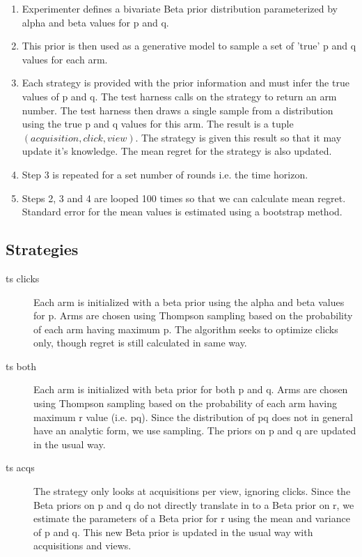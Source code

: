 \documentclass[11pt,a4,singlespacing,titlepagenumber=on]{scrreprt}
\numberwithin{equation}{chapter} %
\theoremstyle{remark}
\begin{document}
\begin{enumerate}
	\item Experimenter defines a bivariate Beta prior distribution parameterized by alpha and beta values for p and q.
	\item This prior is then used as a generative model to sample a set of 'true' p and q values for each arm.
	\item Each strategy is provided with the prior information and must infer the true values of p and q. The test harness calls on the strategy to return an arm number. The test harness then draws a single sample from a distribution using the true p and q values for this arm. The result is a tuple $(acquisition,click,view)$. The strategy is given this result so that it may update it's knowledge. The mean regret for the strategy is also updated.
	\item Step 3 is repeated for a set number of rounds i.e. the time horizon.
	\item Steps 2, 3 and 4 are looped 100 times so that we can calculate mean regret. Standard error for the mean values is estimated using a bootstrap method.
\end{enumerate}





\subsection{Strategies}

\begin{description}
	\item[ts clicks] Each arm is initialized with a beta prior using the alpha and beta values for p. Arms are chosen using Thompson sampling based on the probability of each arm having maximum p. The algorithm seeks to optimize clicks only, though regret is still calculated in same way.
	\item[ts both] Each arm is initialized with beta prior for both p and q. Arms are chosen using Thompson sampling based on the probability of each arm having maximum r value (i.e. pq). Since the distribution of pq does not in general have an analytic form, we use sampling. The priors on p and q are updated in the usual way.
	\item[ts acqs] The strategy only looks at acquisitions per view, ignoring clicks. Since the Beta priors on p and q do not directly translate in to a Beta prior on r, we estimate the parameters of a Beta prior for r using the mean and variance of p and q. This new Beta prior is updated in the usual way with acquisitions and views.
\end{description}
\end{document}
